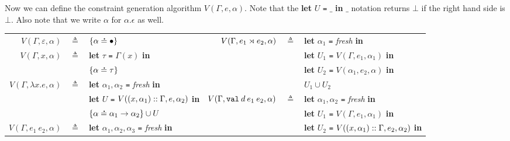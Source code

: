 \documentclass{article}
\begin{document}
Now we can define the constraint generation algorithm $V(\Gamma,e,\alpha)$.
Note that the \textbf{let} $U$ \texttt{=} $\_$ \textbf{in} $\_$ notation returns $\bot$ if the right hand side is $\bot$.
Also note that we write $\alpha$ for $\alpha.\epsilon$ as well.

\begin{flushright}\end{flushright}
\hspace{-2.5em}
\begin{tabular}{rclrcl}
  $V(\Gamma,\varepsilon,\alpha)$ & $\triangleq$ & $\{\alpha\overset{\,_{\mbox{\Large .}}}{=}\bullet\}$                                                             & $V(\Gamma,{e_1}\rtimes{e_2},\alpha)$         & $\triangleq$ & \textbf{let} $\alpha_1$ \texttt{=} \textit{fresh} \textbf{in}                       \\
  $V(\Gamma,x,\alpha)$           & $\triangleq$ & \textbf{let} $\tau$ \texttt{=} $\Gamma(x)$ \textbf{in}                               &                                            &              & \textbf{let} $U_1$ \texttt{=} $V(\Gamma,e_1,\alpha_1)$ \textbf{in}                  \\
                                 &              & $\{\alpha\overset{\,_{\mbox{\Large .}}}{=}\tau\}$                                                                &                                            &              & \textbf{let} $U_2$ \texttt{=} $V(\alpha_1,e_2,\alpha)$  \textbf{in}                 \\
  $V(\Gamma,\lambda x.e,\alpha)$ & $\triangleq$ & \textbf{let} $\alpha_1,\alpha_2$ \texttt{=} \textit{fresh} \textbf{in}               &                                            &              & $U_1\cup U_2$                                                                       \\
                                 &              & \textbf{let} $U$ \texttt{=} $V((x,\alpha_1)::\Gamma,e,\alpha_2)$ \textbf{in}      & $V(\Gamma,\mathtt{val}\:d\:e_1\:e_2,\alpha)$ & $\triangleq$ & \textbf{let} $\alpha_1,\alpha_2$ \texttt{=} \textit{fresh} \textbf{in}              \\
                                 &              & $\{\alpha\overset{\,_{\mbox{\Large .}}}{=}\alpha_1\rightarrow\alpha_2\}\cup U$                                   &                                            &              & \textbf{let} $U_1$ \texttt{=} $V(\Gamma,e_1,\alpha_1)$ \textbf{in}                  \\
  $V(\Gamma,e_1\:e_2,\alpha)$    & $\triangleq$ & \textbf{let} $\alpha_1,\alpha_2,\alpha_3$ \texttt{=} \textit{fresh} \textbf{in}      &                                            &              & \textbf{let} $U_2$ \texttt{=} $V((x,\alpha_1)::\Gamma,e_2,\alpha_2)$ \textbf{in} \\

\end{tabular}
\end{document}
